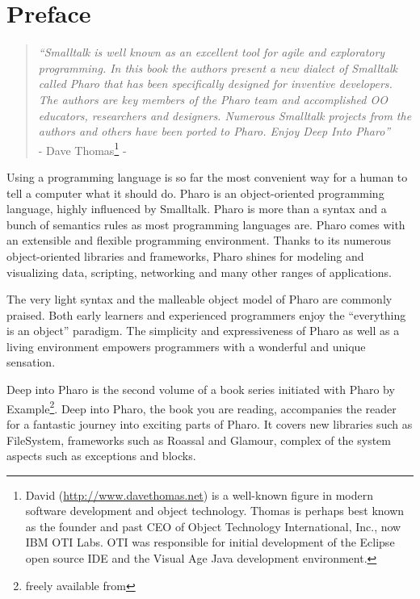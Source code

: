 \documentclass[a4paper,10pt,twoside]{book}
\begin{document}
	\sloppy
	\frontmatter
\fi
\chapter{Preface}

\indent

 \begin{quote}
   \emph{``Smalltalk is well known as an excellent tool for agile and exploratory programming.  In this book the authors present a new dialect of Smalltalk called Pharo that has been specifically designed for inventive developers.  The authors are key members of the Pharo team and accomplished OO educators, researchers and designers.   Numerous Smalltalk projects from the authors and others have been ported to Pharo.  Enjoy Deep Into Pharo''} \\ - Dave Thomas\footnote{David (\url{http://www.davethomas.net}) is a well-known figure in modern software development and object technology. Thomas is perhaps best known as the founder and past CEO of Object Technology International, Inc., now IBM OTI Labs. OTI was responsible for initial development of the Eclipse open source IDE and the Visual Age Java development environment.} -   
\end{quote}

Using a programming language is so far the most convenient way for a human to tell  a computer what it should do. Pharo is an object-oriented programming language, highly influenced by Smalltalk. Pharo is more than a syntax and a bunch of semantics rules as most programming languages are. Pharo comes with an extensible and flexible programming environment. Thanks to its numerous object-oriented libraries and frameworks, Pharo shines for modeling and visualizing data, scripting, networking and many other ranges of applications.

The very light syntax and the malleable object model of Pharo are commonly praised. Both early learners and experienced programmers enjoy the ``everything is an object'' paradigm. The simplicity and expressiveness of Pharo as well as a living environment empowers programmers with a wonderful and unique sensation. 

Deep into Pharo is the second volume of a book series initiated with Pharo by Example\footnote{freely available from }. 
Deep into Pharo, the book you are reading, accompanies the reader for a fantastic journey into exciting parts of Pharo. It covers new libraries such as FileSystem, frameworks such as Roassal and Glamour, complex of the system aspects such as exceptions and blocks. 
\end{document}
